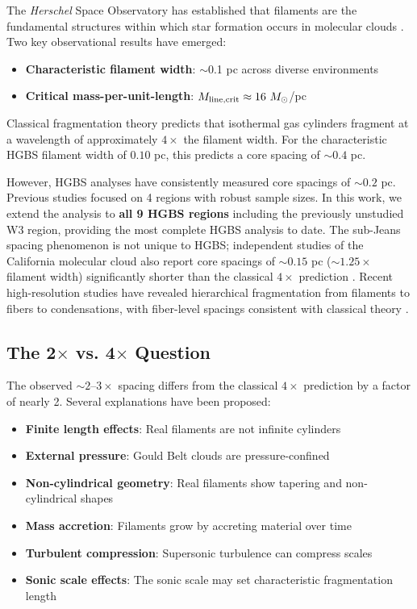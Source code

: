 \documentclass[11pt,a4paper]{article}
\begin{document}
The \textit{Herschel} Space Observatory has established that filaments are the fundamental structures within which star formation occurs in molecular clouds \citep{Andre2010}. Two key observational results have emerged:

\begin{itemize}
    \item \textbf{Characteristic filament width}: $\sim$0.1 pc across diverse environments \citep{Arzoumanian2011}
    \item \textbf{Critical mass-per-unit-length}: $M_{\rm line,crit} \approx 16~M_\odot$/pc \citep{Ostriker1964}
\end{itemize}

Classical fragmentation theory \citep{Inutsuka1992} predicts that isothermal gas cylinders fragment at a wavelength of approximately $4\times$ the filament width. For the characteristic HGBS filament width of $0.10$ pc, this predicts a core spacing of $\sim0.4$ pc.

However, HGBS analyses have consistently measured core spacings of $\sim0.2$ pc. Previous studies focused on 4 regions with robust sample sizes. In this work, we extend the analysis to \textbf{all 9 HGBS regions} including the previously unstudied W3 region, providing the most complete HGBS analysis to date. The sub-Jeans spacing phenomenon is not unique to HGBS; independent studies of the California molecular cloud also report core spacings of $\sim0.15$ pc ($\sim1.25\times$ filament width) significantly shorter than the classical $4\times$ prediction \citep{Zhang2024}. Recent high-resolution studies have revealed hierarchical fragmentation from filaments to fibers to condensations, with fiber-level spacings consistent with classical theory \citep{Yang2024}.

\subsection{The 2$\times$ vs. 4$\times$ Question}

The observed $\sim2$--$3\times$ spacing differs from the classical $4\times$ prediction by a factor of nearly 2. Several explanations have been proposed:
\begin{itemize}
    \item \textbf{Finite length effects}: Real filaments are not infinite cylinders \citep{Inutsuka1997}
    \item \textbf{External pressure}: Gould Belt clouds are pressure-confined \citep{Fischera2012}
    \item \textbf{Non-cylindrical geometry}: Real filaments show tapering and non-cylindrical shapes
    \item \textbf{Mass accretion}: Filaments grow by accreting material over time \citep{Heitsch2013, Chen2024}
    \item \textbf{Turbulent compression}: Supersonic turbulence can compress scales \citep{Padoan2011}
    \item \textbf{Sonic scale effects}: The sonic scale may set characteristic fragmentation length \citep{Federrath2016}
\end{itemize}
\end{document}

